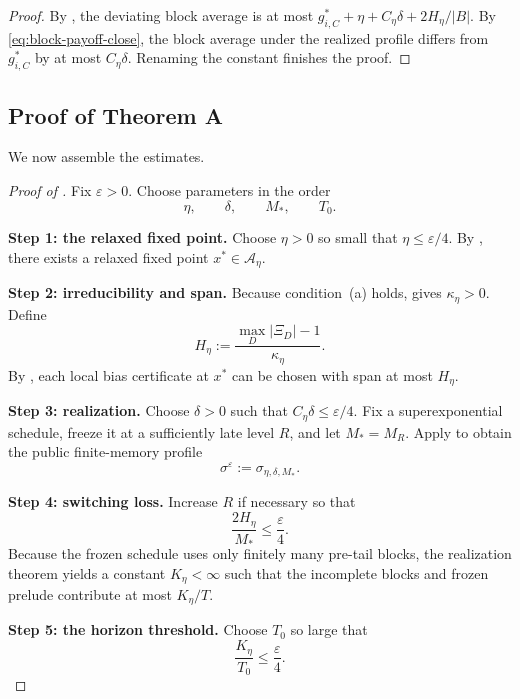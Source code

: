 \documentclass[12pt]{article}
\theoremstyle{definition}
\newcommand{\eps}{\varepsilon}
\newcommand{\1}{\mathbf{1}}
\newcommand{\cA}{\mathcal{A}}
\begin{document}
\begin{proof}
By , the deviating block average is at most
\(g_{i,C}^*+\eta+C_\eta\delta+2H_\eta/|B|\).  By \eqref{eq:block-payoff-close}, the block
average under the realized profile differs from \(g_{i,C}^*\) by at most \(C_\eta\delta\).
Renaming the constant finishes the proof.
\end{proof}

\subsection{Proof of Theorem A}

We now assemble the estimates.

\begin{proof}[Proof of ]
Fix \(\eps>0\).  Choose parameters in the order
\[
\eta,\qquad \delta,\qquad M_*,\qquad T_0.
\]

\smallskip
\noindent\textbf{Step 1: the relaxed fixed point.}
Choose \(\eta>0\) so small that \(\eta\le \eps/4\).  By , there exists
a relaxed fixed point \(x^*\in \cA_\eta\).

\smallskip
\noindent\textbf{Step 2: irreducibility and span.}
Because condition~(a) holds,  gives \(\kappa_\eta>0\).  Define
\[
H_\eta:=\frac{\max_D|\Xi_D|-1}{\kappa_\eta}.
\]
By , each local bias certificate at \(x^*\) can be chosen with span
at most \(H_\eta\).

\smallskip
\noindent\textbf{Step 3: realization.}
Choose \(\delta>0\) such that \(C_\eta\delta\le \eps/4\).  Fix a superexponential schedule,
freeze it at a sufficiently late level \(R\), and let \(M_*=M_R\).  Apply
 to obtain the public finite-memory profile
\[
\sigma^\eps:=\sigma_{\eta,\delta,M_*}.
\]

\smallskip
\noindent\textbf{Step 4: switching loss.}
Increase \(R\) if necessary so that
\[
\frac{2H_\eta}{M_*}\le \frac{\eps}{4}.
\]
Because the frozen schedule uses only finitely many pre-tail blocks, the realization
theorem yields a constant \(K_\eta<\infty\) such that the incomplete blocks and frozen
prelude contribute at most \(K_\eta/T\).

\smallskip
\noindent\textbf{Step 5: the horizon threshold.}
Choose \(T_0\) so large that
\[
\frac{K_\eta}{T_0}\le \frac{\eps}{4}.
\]


\end{proof}
\end{document}
